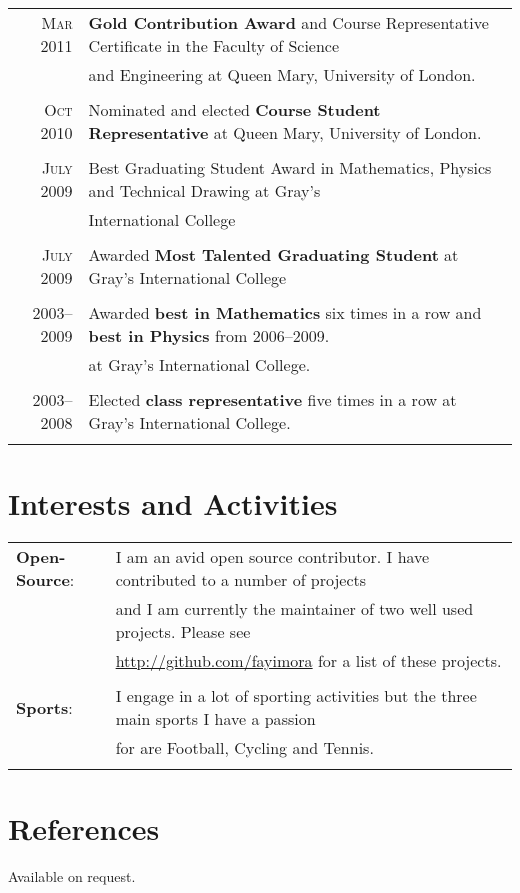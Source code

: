 \documentclass[a4paper,10pt]{article}
\begin{document}
\begin{tabular}{rl}
  \textsc{Mar} 2011 & \textbf{Gold Contribution Award} and Course Representative Certificate in the
  Faculty of Science\\& and Engineering at Queen Mary, University of London.\\\\


  \textsc{Oct} 2010 & Nominated and elected \textbf{Course Student Representative} at Queen Mary,
  University of London.\\\\

  \textsc{July} 2009 & Best Graduating Student Award in Mathematics, Physics and Technical Drawing
  at Gray’s\\& International College\\\\

  \textsc{July} 2009 & Awarded \textbf{Most Talented Graduating Student} at Gray’s International
  College\\\\

  \textsc{2003--2009} & Awarded \textbf{best in Mathematics} six times in a row and \textbf{best in
  Physics} from 2006--2009.\\& at Gray's International College.\\\\

  \textsc{2003--2008} & Elected \textbf{class representative} five times in a row at Gray's
  International College.\\\\
\end{tabular}

\section{Interests and Activities}
\begin{tabular}{ll}
  \textbf{Open-Source}: &  I am an avid open source contributor. I have contributed to a number
  of projects\\& and I am currently the maintainer of two well used projects. Please see\\&
  \url{http://github.com/fayimora} for a list of these projects.\\\\


  \textbf{Sports}: & I engage in a lot of sporting activities but the three main sports I have a
  passion\\& for are Football, Cycling and Tennis.\\\\
\end{tabular}

\section{References}
Available on request.\\\\
\end{document}

